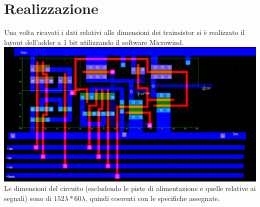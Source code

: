 \documentclass[12pt]{article} %
\begin{document}
\section{Realizzazione}
Una volta ricavati i dati relativi alle dimensioni dei trainsistor si è realizzato il layout dell'adder a 1 bit utilizzando il software Microwind.\\
\includegraphics[scale=0.4]{Layout1_152x60}
Le dimensioni del circuito (escludendo le piste di alimentazione e quelle relative ai segnali) sono di $152 \lambda * 60 \lambda$, quindi coerenti con le specifiche assegnate.

\clearpage
\end{document}
